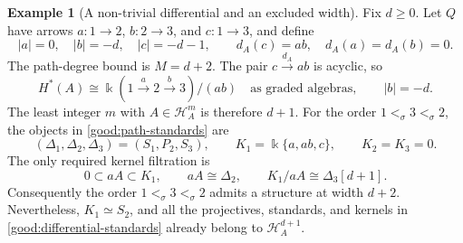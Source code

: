 \documentclass[11pt,a4paper]{article}
\renewcommand{\H}{\mathcal H}
\newcommand{\std}{\Delta}
\theoremstyle{plain}
\theoremstyle{definition}
\newtheorem{example}[theorem]{Example}
\numberwithin{equation}{section}
\begin{document}
\begin{example}[A non-trivial differential and an excluded width]
\label{good:differential}
Fix $d\geq0$. Let $Q$ have arrows $a:1\to2$, $b:2\to3$, and
$c:1\to3$, and define
\begin{equation}\label{good:differential-algebra}
 |a|=0,\quad |b|=-d,\quad |c|=-d-1,\qquad
 d_A(c)=ab,\quad d_A(a)=d_A(b)=0.
\end{equation}
The path-degree bound is $M=d+2$. The pair
$c\xrightarrow{d_A}ab$ is acyclic, so
\begin{equation}\label{good:differential-cohomology}
 H^*(A)\cong\Bbbk(1\xrightarrow{a}2\xrightarrow{b}3)/(ab)
 \quad\text{as graded algebras},\qquad |b|=-d.
\end{equation}
The least integer $m$ with $A\in\H_A^m$ is therefore $d+1$.
For the order $1<_\sigma3<_\sigma2$, the objects in
\eqref{good:path-standards} are
\begin{equation}\label{good:differential-standards}
 (\std_1,\std_2,\std_3)=(S_1,P_2,S_3),\qquad
 K_1=\Bbbk\{a,ab,c\},\qquad K_2=K_3=0.
\end{equation}
The only required kernel filtration is
\begin{equation}\label{good:differential-filtration}
 0\subset aA\subset K_1,\qquad
 aA\cong\std_2,\qquad K_1/aA\cong\std_3[d+1].
\end{equation}
Consequently the order $1<_\sigma3<_\sigma2$ admits a structure at
width $d+2$. Nevertheless, $K_1\simeq S_2$, and all the projectives,
standards, and kernels in \eqref{good:differential-standards} already
belong to $\H_A^{d+1}$.


\end{example}
\end{document}
